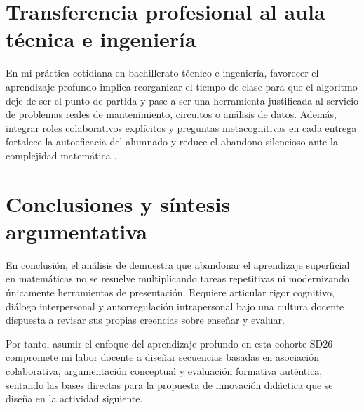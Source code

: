 \documentclass[spanish,letterpaper,oneside]{article}
\begin{document}
\section{Transferencia profesional al aula técnica e ingeniería}
En mi práctica cotidiana en bachillerato técnico e ingeniería, favorecer el aprendizaje profundo implica reorganizar el tiempo de clase para que el algoritmo deje de ser el punto de partida y pase a ser una herramienta justificada al servicio de problemas reales de mantenimiento, circuitos o análisis de datos. Además, integrar roles colaborativos explícitos y preguntas metacognitivas en cada entrega fortalece la autoeficacia del alumnado y reduce el abandono silencioso ante la complejidad matemática \citep{conalep2025mecatronica}.

\clearpage
\section{Conclusiones y síntesis argumentativa}
En conclusión, el análisis de \citet{quiroga2022aprendizaje} demuestra que abandonar el aprendizaje superficial en matemáticas no se resuelve multiplicando tareas repetitivas ni modernizando únicamente herramientas de presentación. Requiere articular rigor cognitivo, diálogo interpersonal y autorregulación intrapersonal bajo una cultura docente dispuesta a revisar sus propias creencias sobre enseñar y evaluar.

Por tanto, asumir el enfoque del aprendizaje profundo en esta cohorte SD26 compromete mi labor docente a diseñar secuencias basadas en asociación colaborativa, argumentación conceptual y evaluación formativa auténtica, sentando las bases directas para la propuesta de innovación didáctica que se diseña en la actividad siguiente.
\end{document}
